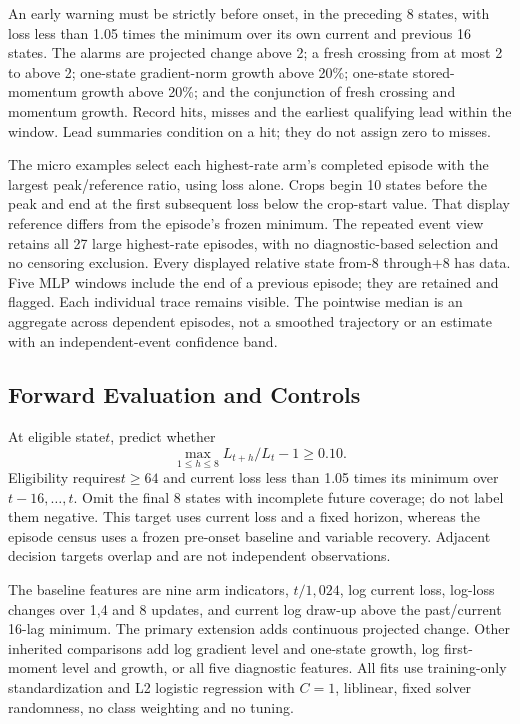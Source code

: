 An early warning must be strictly before onset, in the preceding 8 states,
with loss less than 1.05 times the minimum over its own current and previous 16
states. The alarms are projected change above 2; a fresh crossing from at most 2
to above 2; one-state gradient-norm growth above 20\%; one-state stored-momentum
growth above 20\%; and the conjunction of fresh crossing and momentum growth.
Record hits, misses and the earliest qualifying lead within the window.
Lead summaries condition on a hit; they do not assign zero to misses.

The micro examples select each highest-rate arm's completed episode with the
largest peak/reference ratio, using loss alone. Crops begin 10 states before
the peak and end at the first subsequent loss below the crop-start value.
That display reference differs from the episode's frozen minimum. The repeated
event view retains all 27 large highest-rate episodes, with no diagnostic-based
selection and no censoring exclusion. Every displayed relative state from-8
through+8 has data. Five MLP windows include the end of a previous episode;
they are retained and flagged. Each individual trace remains visible. The
pointwise median is an aggregate across dependent episodes, not a smoothed
trajectory or an estimate with an independent-event confidence band.

\subsection{Forward Evaluation and Controls}

At eligible state$t$, predict whether
\begin{equation}
  \max_{1\leq h\leq 8} L_{t+h}/L_t-1\geq 0.10.
\end{equation}
Eligibility requires$t\geq 64$ and current loss less than 1.05 times its minimum
over$t-16,\ldots,t$. Omit the final 8 states with incomplete future coverage;
do not label them negative. This target uses current loss and a fixed horizon,
whereas the episode census uses a frozen pre-onset baseline and variable recovery.
Adjacent decision targets overlap and are not independent observations.

The baseline features are nine arm indicators, $t/1,024$, log current loss,
log-loss changes over 1,4 and 8 updates, and current log draw-up above the
past/current 16-lag minimum. The primary extension adds continuous projected
change. Other inherited comparisons add log gradient level and one-state
growth, log first-moment level and growth, or all five diagnostic features.
All fits use training-only standardization and L2 logistic regression with
$C=1$, liblinear, fixed solver randomness, no class weighting and no tuning.

